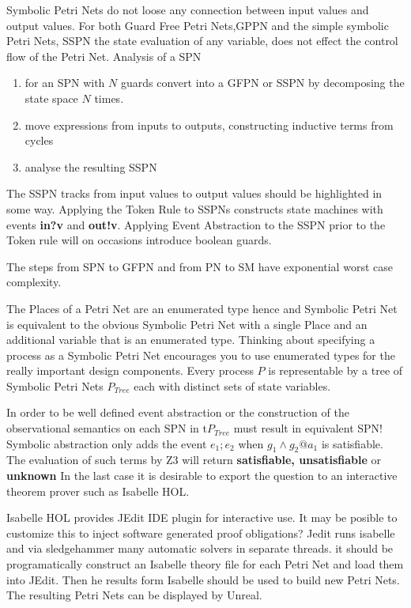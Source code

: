 Symbolic Petri Nets do not loose any  connection between input values and output values.  For both Guard Free Petri Nets,GPPN and the simple symbolic Petri Nets, SSPN the state evaluation of any variable, does not effect the control flow of the Petri Net. Analysis of a SPN 
\begin{enumerate}
\item for an SPN with $N$ guards convert into a GFPN or SSPN by decomposing  the state space  $N$ times.
\item move expressions from inputs to outputs, constructing inductive terms from cycles
\item analyse the resulting SSPN
\end{enumerate}    
The SSPN tracks from input values to output values should  be highlighted in some way. Applying  the Token Rule to SSPNs  constructs state machines with events {\bf in?v} and {\bf out!v}. Applying Event Abstraction to the SSPN prior to the Token rule will on occasions  introduce boolean guards.

The steps from SPN to GFPN and from PN to SM have exponential worst case complexity.

 The Places of a Petri Net are an enumerated type  hence and Symbolic Petri Net is equivalent to the obvious  Symbolic Petri Net with a single Place and an additional variable that is an enumerated type. Thinking about specifying a process as a Symbolic Petri Net encourages you to use enumerated types for the really important design components. Every process $P$ is representable by a tree of Symbolic Petri Nets $P_{Tree}$ each with distinct sets of state variables.

In order to be well defined event abstraction or the construction of the observational semantics on each SPN in t$P_{Tree}$ must result in equivalent SPN! Symbolic abstraction only adds the event $e_1;e_2$ when $g_1 \wedge g_2@a_1$ is  satisfiable. The evaluation of such terms by Z3 will return {\bf satisfiable, unsatisfiable} or {\bf unknown} In the last case it is desirable to export the question to an interactive theorem prover such as Isabelle HOL. 

Isabelle HOL provides JEdit IDE plugin for interactive use. It may be posible to customize this to inject software generated proof obligations? Jedit runs isabelle and via sledgehammer many automatic solvers in separate threads. it should be programatically construct an Isabelle theory file for each Petri Net and load them into JEdit. Then he results form Isabelle should be used to build new Petri Nets.
The resulting Petri Nets can be displayed by Unreal.


